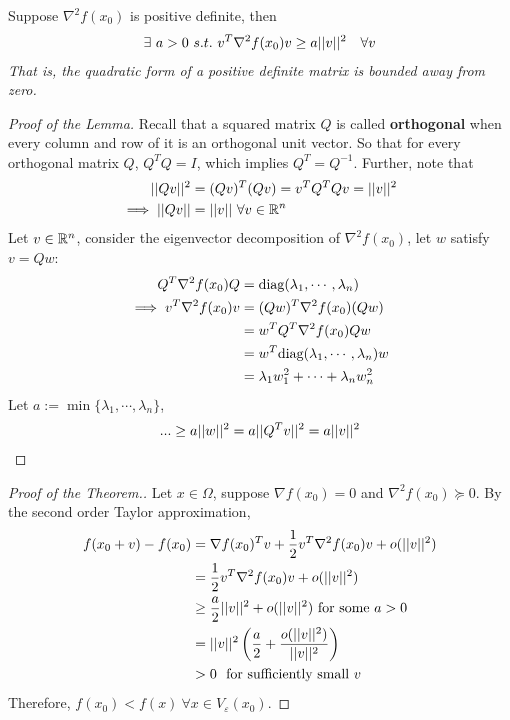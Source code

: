 \documentclass{article}
\begin{document}
   	\begin{lemma}
   		Suppose $\nabla^2 f(x_0)$ is positive definite, then 
   		\begin{align}
   			\exists\ a > 0\ s.t.\ v^T \nabla^2 f(x_0) v \geq a \vert \vert {v} \vert \vert^2\quad \forall v
   		\end{align}
   		\emph{That is, the quadratic form of a positive definite matrix is bounded away from zero.}
   	\end{lemma}
   	
   	\begin{proof}[Proof of the Lemma]
   		Recall that a squared matrix $Q$ is called \textbf{orthogonal} when every column and row of it is an orthogonal unit vector. So that for every orthogonal matrix $Q$, $Q^T Q = I$, which implies $Q^T = Q^{-1}$. Further, note that 
   		\begin{align}
   			\vert \vert {Qv} \vert \vert^2 &= (Qv)^T (Qv)
   			= v^T Q^T Q v 
   			= \vert \vert {v} \vert \vert^2 \\
   			\implies \vert \vert {Qv} \vert \vert &= \vert \vert {v} \vert \vert\ \forall v \in \mathbb{R}^n
   		\end{align}
   		Let $v \in \mathbb{R}^n$, consider the eigenvector decomposition of $\nabla^2 f(x_0)$, let $w$ satisfy $v = Qw$:
   		\begin{align}
   			Q^T \nabla^2 f(x_0) Q &= \text{{diag}}(\lambda_1, \cdots, \lambda_n) \\
   			\implies v^T \nabla^2 f(x_0) v &= (Qw)^T \nabla^2 f(x_0) (Qw) \\
   			&= w^T Q^T \nabla^2 f(x_0) Q w \\
   			&= w^T \text{{diag}}(\lambda_1, \cdots, \lambda_n) w \\
   			&= \lambda_1 w_1^2 + \cdots + \lambda_n w_n^2
   		\end{align}
   		Let $a := \min\{\lambda_1, \cdots, \lambda_n\}$,
   		\begin{align}
   			... \geq a \vert \vert {w} \vert \vert^2 = a\vert \vert {Q^T v} \vert \vert^2 = a \vert \vert {v} \vert \vert^2
   		\end{align}
   	\end{proof}
   	
   	\begin{proof}[Proof of the Theorem.]
   		Let $x \in \Omega$, suppose $\nabla f(x_0) = 0$ and $\nabla^2 f(x_0) \succcurlyeq 0$. By the second order Taylor approximation,
   		\begin{align}
   			f(x_0 + v) - f(x_0) &= \nabla f(x_0)^T v + \frac{1}{2} v^T \nabla^2 f(x_0) v + o(\vert \vert {v} \vert \vert^2) \\
   			&= \frac{1}{2} v^T \nabla^2 f(x_0) v + o(\vert \vert {v} \vert \vert^2) \\
   			&\geq \frac{a}{2} \vert \vert {v} \vert \vert^2 + o(\vert \vert {v} \vert \vert^2) \text{{ for some }}a > 0 \\
   			&= \vert \vert {v} \vert \vert^2 \left (
   			\frac{a}{2} + \frac{o(\vert \vert {v} \vert \vert^2)}{\vert \vert {v} \vert \vert^2} \right) \\
   			&>0\ \text{{ for sufficiently small }} v
   		\end{align}
   		Therefore, $f(x_0) < f(x)\ \forall x \in V_\varepsilon(x_0)$.
   	\end{proof}
   	
\end{document}
